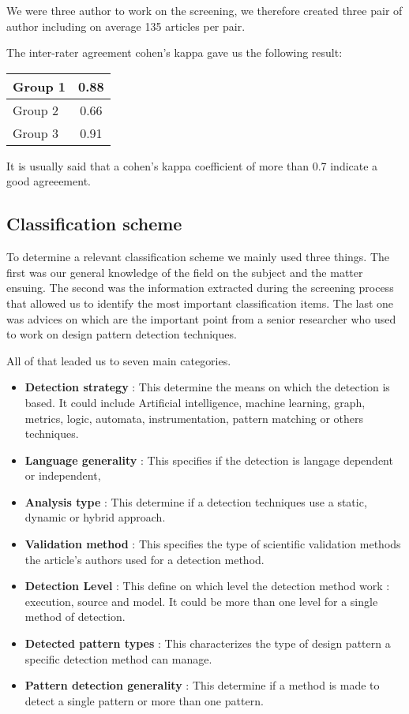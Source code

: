 \documentclass[letterpaper, 10 pt, conference]{ieeeconf}  %
\begin{document}
We were three author to work on the screening, we therefore created three pair of author including on average 135 articles per pair.

The inter-rater agreement cohen's kappa gave us the following result:

\begin{center}
  \begin{tabular}{ | l | c | }
    \hline
    Group 1 & 0.88 \\ \hline
    Group 2 & 0.66 \\ \hline
    Group 3 & 0.91 \\
    \hline
  \end{tabular}
\end{center}

It is usually said that a cohen's kappa coefficient of more than 0.7 indicate a good agreeement.%

\subsection{Classification scheme}

To determine a relevant classification scheme we mainly used three things. The first was our general knowledge of the field on the subject and the matter ensuing. The second was the information extracted during the screening process that allowed us to identify the most important classification items. The last one was advices on which are the important point from a senior researcher who used to work on design pattern detection techniques.

All of that leaded us to seven main categories.

\begin{itemize}
	\item \textbf{Detection strategy} : This determine the means on which the detection is based. It could include Artificial intelligence, machine learning, graph, metrics, logic, automata, instrumentation, pattern matching or others techniques.
	\item \textbf{Language generality} : This specifies if the detection is langage dependent or independent,
	\item \textbf{Analysis type} : This determine if a detection techniques use a static, dynamic or hybrid approach.
	\item \textbf{Validation method} : This specifies the type of scientific validation methods the article's authors used for a detection method.
	\item \textbf{Detection Level} : This define on which level the detection method work : execution, source and model. It could be more than one level for a single method of detection.
	\item \textbf{Detected pattern types} : This characterizes the type of design pattern a specific detection method can manage.
	\item \textbf{Pattern detection generality} : This determine if a method is made to detect a single pattern or more than one pattern.
\end{itemize}
\end{document}
